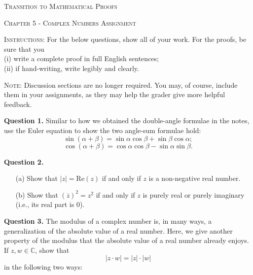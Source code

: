 \documentclass[10pt]{report}
\begin{document}
\begin{center}\textsc{\Large Transition to Mathematical Proofs}

\textsc{\large Chapter 5 - Complex Numbers Assignment}

\bigskip

\end{center}

\noindent\textsc{Instructions:}  For the below questions, show all of your work.  For the proofs, be sure that you \\

\noindent
(i) write a complete proof in full English sentences; \\
(ii) if hand-writing, write legibly and clearly.

\medskip



\noindent\textsc{Note:}  Discussion sections are no longer required.  You may, of course, include them in your assignments, as they may help the grader give more helpful feedback.  


\bigskip

\noindent\textbf{Question 1.}  Similar to how we obtained the double-angle formulae in the notes, use the Euler equation to show the two angle-sum formulae hold:  $$\sin (\alpha+ \beta) = \sin \alpha \cos \beta + \sin \beta \cos \alpha; $$ $$\cos(\alpha + \beta) = \cos \alpha \cos \beta - \sin \alpha \sin \beta.$$

\bigskip


\noindent\textbf{Question 2.}  

\begin{itemize}

\item[(a)]  Show that $|z| = \textrm{Re}(z)$ if and only if $z$ is a non-negative real number.

\item[(b)]  Show that $\left(\overline z\right)^2 = z^2$ if and only if $z$ is purely real or purely imaginary (i.e., its real part is $0$).  

\end{itemize}

\bigskip

\noindent\textbf{Question 3.}  The modulus of a complex number is, in many ways, a generalization of the absolute value of a real number.  Here, we give another property of the modulus that the absolute value of a real number already enjoys.  \\ \medskip
 If $z, w \in \mathbb C$, show that $$|z \cdot w| = |z| \cdot |w|$$ in the following two ways:
\end{document}
